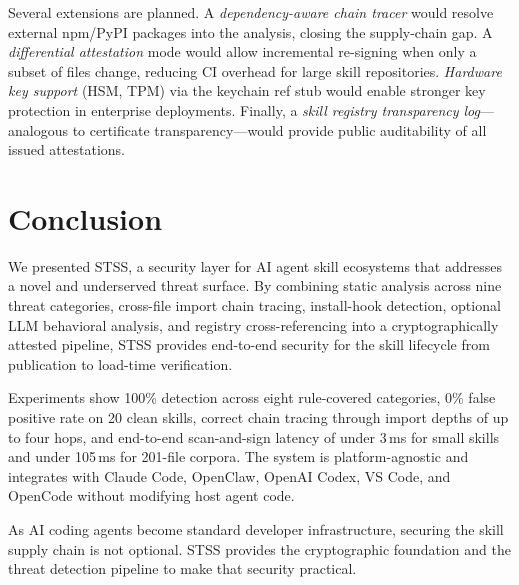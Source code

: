 \documentclass[11pt,twocolumn]{article}
\begin{document}
Several extensions are planned. A \emph{dependency-aware chain tracer} would
resolve external npm/PyPI packages into the analysis, closing the supply-chain
gap. A \emph{differential attestation} mode would allow incremental re-signing
when only a subset of files change, reducing CI overhead for large skill
repositories. \emph{Hardware key support} (HSM, TPM) via the keychain ref
stub would enable stronger key protection in enterprise deployments.
Finally, a \emph{skill registry transparency log}---analogous to certificate
transparency---would provide public auditability of all issued attestations.

\section{Conclusion}
\label{sec:conclusion}

We presented STSS, a security layer for AI agent skill ecosystems that addresses
a novel and underserved threat surface. By combining static analysis across nine
threat categories, cross-file import chain tracing, install-hook detection,
optional LLM behavioral analysis, and registry cross-referencing into a
cryptographically attested pipeline, STSS provides end-to-end security for the
skill lifecycle from publication to load-time verification.

Experiments show 100\% detection across eight rule-covered categories,
0\% false positive rate on 20 clean skills, correct chain tracing through
import depths of up to four hops, and end-to-end scan-and-sign latency of
under 3\,ms for small skills and under 105\,ms for 201-file corpora.
The system is platform-agnostic and integrates with Claude Code, OpenClaw,
OpenAI Codex, VS Code, and OpenCode without modifying host agent code.

As AI coding agents become standard developer infrastructure, securing the
skill supply chain is not optional. STSS provides the cryptographic foundation
and the threat detection pipeline to make that security practical.

\balance


\end{document}
